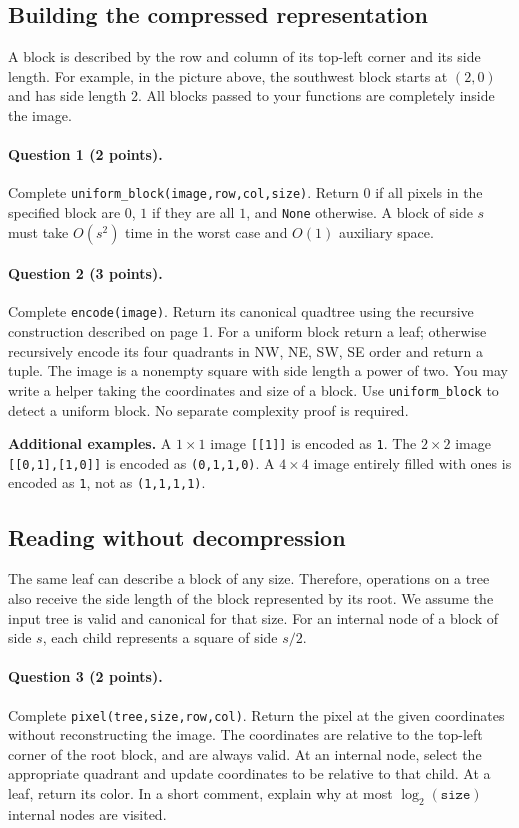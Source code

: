 \documentclass[11pt,a4paper]{article}
\newcommand{\q}[2]{\paragraph{Question #1 (#2 points).}}
\begin{document}
\subsection*{Building the compressed representation}
A block is described by the row and column of its top-left corner and its side length. For example, in the picture above, the southwest block starts at $(2,0)$ and has side length $2$. All blocks passed to your functions are completely inside the image.
\q{1}{2} Complete \texttt{uniform\_block(image,row,col,size)}. Return $0$ if all pixels in the specified block are $0$, $1$ if they are all $1$, and \texttt{None} otherwise. A block of side $s$ must take $O(s^2)$ time in the worst case and $O(1)$ auxiliary space.
\q{2}{3} Complete \texttt{encode(image)}. Return its canonical quadtree using the recursive construction described on page 1. For a uniform block return a leaf; otherwise recursively encode its four quadrants in NW, NE, SW, SE order and return a tuple. The image is a nonempty square with side length a power of two. You may write a helper taking the coordinates and size of a block. Use \texttt{uniform\_block} to detect a uniform block. No separate complexity proof is required.

\textbf{Additional examples.} A $1\times1$ image \texttt{[[1]]} is encoded as \texttt{1}. The $2\times2$ image \texttt{[[0,1],[1,0]]} is encoded as \texttt{(0,1,1,0)}. A $4\times4$ image entirely filled with ones is encoded as \texttt{1}, not as \texttt{(1,1,1,1)}.
\subsection*{Reading without decompression}
The same leaf can describe a block of any size. Therefore, operations on a tree also receive the side length of the block represented by its root. We assume the input tree is valid and canonical for that size. For an internal node of a block of side $s$, each child represents a square of side $s/2$.
\newpage
\q{3}{2} Complete \texttt{pixel(tree,size,row,col)}. Return the pixel at the given coordinates without reconstructing the image. The coordinates are relative to the top-left corner of the root block, and are always valid. At an internal node, select the appropriate quadrant and update coordinates to be relative to that child. At a leaf, return its color. In a short comment, explain why at most $\log_2(\texttt{size})$ internal nodes are visited.
\end{document}
